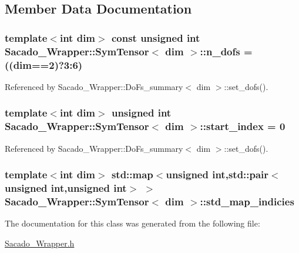 \subsection{Member Data Documentation}
\subsubsection[{\texorpdfstring{n\+\_\+dofs}{n_dofs}}]{\setlength{\rightskip}{0pt plus 5cm}template$<$int dim$>$ const unsigned {\bf int} {\bf Sacado\+\_\+\+Wrapper\+::\+Sym\+Tensor}$<$ dim $>$\+::n\+\_\+dofs = ((dim==2)?3\+:6)\hspace{0.3cm}{\ttfamily [static]}}\hypertarget{classSacado__Wrapper_1_1SymTensor_a733bc4b029ff8d067b48e7ce3ee7606b}{}\label{classSacado__Wrapper_1_1SymTensor_a733bc4b029ff8d067b48e7ce3ee7606b}


Referenced by Sacado\+\_\+\+Wrapper\+::\+Do\+Fs\+\_\+summary$<$ dim $>$\+::set\+\_\+dofs().

\subsubsection[{\texorpdfstring{start\+\_\+index}{start_index}}]{\setlength{\rightskip}{0pt plus 5cm}template$<$int dim$>$ unsigned {\bf int} {\bf Sacado\+\_\+\+Wrapper\+::\+Sym\+Tensor}$<$ dim $>$\+::start\+\_\+index = 0}\hypertarget{classSacado__Wrapper_1_1SymTensor_afe921e6044e4110fcfc848c52844d650}{}\label{classSacado__Wrapper_1_1SymTensor_afe921e6044e4110fcfc848c52844d650}


Referenced by Sacado\+\_\+\+Wrapper\+::\+Do\+Fs\+\_\+summary$<$ dim $>$\+::set\+\_\+dofs().

\subsubsection[{\texorpdfstring{std\+\_\+map\+\_\+indicies}{std_map_indicies}}]{\setlength{\rightskip}{0pt plus 5cm}template$<$int dim$>$ std\+::map$<$unsigned {\bf int},std\+::pair$<$unsigned {\bf int},unsigned {\bf int}$>$ $>$ {\bf Sacado\+\_\+\+Wrapper\+::\+Sym\+Tensor}$<$ dim $>$\+::std\+\_\+map\+\_\+indicies}\hypertarget{classSacado__Wrapper_1_1SymTensor_ae3b1c56cde3fc5c7805b618ef3d9de75}{}\label{classSacado__Wrapper_1_1SymTensor_ae3b1c56cde3fc5c7805b618ef3d9de75}


The documentation for this class was generated from the following file\+:\begin{DoxyCompactItemize}
\item 
\hyperlink{Sacado__Wrapper_8h}{Sacado\+\_\+\+Wrapper.\+h}\end{DoxyCompactItemize}
